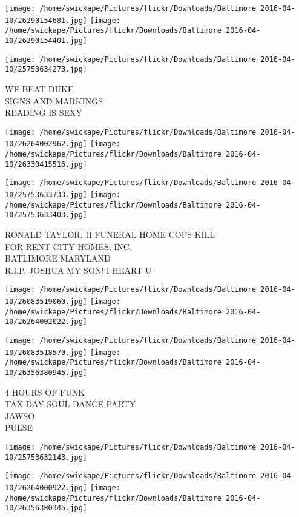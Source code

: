 \documentclass[10pt,letterpaper]{article}
\begin{document}
\texttt{[image: /home/swickape/Pictures/flickr/Downloads/Baltimore 2016-04-10/26290154681.jpg]}
\texttt{[image: /home/swickape/Pictures/flickr/Downloads/Baltimore 2016-04-10/26290154401.jpg]}

\vspace{0.25in}
\texttt{[image: /home/swickape/Pictures/flickr/Downloads/Baltimore 2016-04-10/25753634273.jpg]}

WF BEAT DUKE\\
SIGNS AND MARKINGS\\
READING IS SEXY
\pagebreak

\texttt{[image: /home/swickape/Pictures/flickr/Downloads/Baltimore 2016-04-10/26264002962.jpg]}
\texttt{[image: /home/swickape/Pictures/flickr/Downloads/Baltimore 2016-04-10/26330415516.jpg]}

\texttt{[image: /home/swickape/Pictures/flickr/Downloads/Baltimore 2016-04-10/25753633733.jpg]}
\texttt{[image: /home/swickape/Pictures/flickr/Downloads/Baltimore 2016-04-10/25753633403.jpg]}

RONALD TAYLOR, II FUNERAL HOME COPS KILL\\
FOR RENT CITY HOMES, INC.\\
BATLIMORE MARYLAND\\
R.I.P. JOSHUA MY SON! I HEART U
\pagebreak

\texttt{[image: /home/swickape/Pictures/flickr/Downloads/Baltimore 2016-04-10/26083519060.jpg]}
\texttt{[image: /home/swickape/Pictures/flickr/Downloads/Baltimore 2016-04-10/26264002022.jpg]}

\texttt{[image: /home/swickape/Pictures/flickr/Downloads/Baltimore 2016-04-10/26083518570.jpg]}
\texttt{[image: /home/swickape/Pictures/flickr/Downloads/Baltimore 2016-04-10/26356380945.jpg]}

4 HOURS OF FUNK\\
TAX DAY SOUL DANCE PARTY\\
JAWSO\\
PULSE
\pagebreak

\texttt{[image: /home/swickape/Pictures/flickr/Downloads/Baltimore 2016-04-10/25753632143.jpg]}

\vspace{0.25in}
\texttt{[image: /home/swickape/Pictures/flickr/Downloads/Baltimore 2016-04-10/26264000922.jpg]}
\texttt{[image: /home/swickape/Pictures/flickr/Downloads/Baltimore 2016-04-10/26356380345.jpg]}
\end{document}
